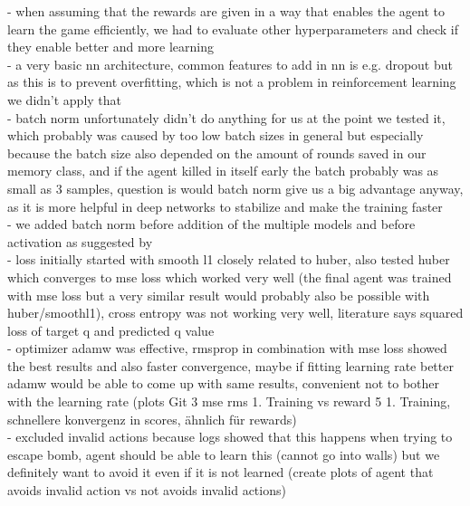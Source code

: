 - when assuming that the rewards are given in a way that enables the agent to learn the game efficiently, we had to evaluate other hyperparameters and check if they enable better and more learning\\
- a very basic nn architecture, common features to add in nn is e.g. dropout but as this is to prevent overfitting, which is not a problem in reinforcement learning we didn't apply that\\
- batch norm unfortunately didn't do anything for us at the point we tested it, which probably was caused by too low batch sizes in general but especially because the batch size also depended on the amount of rounds saved in our memory class, and if the agent killed in itself early the batch probably was as small as 3 samples, question is would batch norm give us a big advantage anyway, as it is more helpful in deep networks to stabilize and make the training faster \\%
- we added batch norm before addition of the multiple models and before activation as suggested by \\%
- loss initially started with smooth l1 closely related to huber, also tested huber which converges to mse loss which worked very well (the final agent was trained with mse loss but a very similar result would probably also be possible with huber/smoothl1), cross entropy was not working very well, literature says squared loss of target q and predicted q value\\ %
- optimizer adamw was effective, rmsprop in combination with mse loss showed the best results and also faster convergence, maybe if fitting learning rate better adamw would be able to come up with same results, convenient not to bother with the learning rate (plots Git 3 mse rms 1. Training vs reward 5 1. Training, schnellere konvergenz in scores, ähnlich für rewards)\\
- excluded invalid actions because logs showed that this happens when trying to escape bomb, agent should be able to learn this (cannot go into walls) but we definitely want to avoid it even if it is not learned (create plots of agent that avoids invalid action vs not avoids invalid actions)\\
